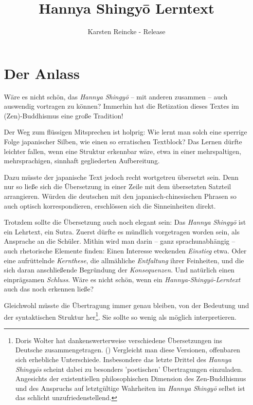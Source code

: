 \documentclass[
DIV=calc,
BCOR=5mm,
11pt,
headings=small,
oneside,
bibtotocnumbered,
english,ngerman]{scrartcl}
\begin{document}

\nocite{*}

\titlehead{Mit Dank an meine Frau für ihren wunderbaren Mut zu neuen guten
Wegen:}
\title{Hannya Shingyō Lerntext}
\author{Karsten Reincke 
 - Release  }

\maketitle
\section{Der Anlass}
 
Wäre es nicht schön, das \emph{Hannya Shingyō} -- mit anderen zusammen -- auch
auswendig vortragen zu können? Immerhin hat die Retization dieses Textes im
(Zen)-Buddhismus eine große Tradition!

Der Weg zum flüssigen Mitsprechen ist holprig: Wie lernt man solch eine sperrige
Folge japanischer Silben, wie einen so erratischen Textblock? Das Lernen dürfte
leichter fallen, wenn eine Struktur erkennbar wäre, etwa in einer
mehrspaltigen, mehrsprachigen, sinnhaft gegliederten Aufbereitung.

Dazu müsste der japanische Text jedoch recht wortgetreu übersetzt sein.
Denn nur so ließe sich die Übersetzung in einer Zeile mit dem übersetzten
Satzteil arrangieren. Würden die deutschen mit den japanisch-chinesischen
Phrasen so auch optisch korrespondieren, erschlössen sich die
Sinneinheiten direkt.

Trotzdem sollte die Übersetzung auch noch elegant sein: Das \emph{Hannya
Shingyō} ist ein Lehrtext, ein Sutra. Zuerst dürfte es mündlich vorgetragen
worden sein, als Ansprache an die Schüler. Mithin wird man darin -- ganz
sprachunabhängig -- auch rhetorische Elemente finden: Einen Interesse weckenden
\emph{Einstieg} etwa. Oder eine aufrüttelnde \emph{Kernthese}, die allmähliche
\emph{Entfaltung} ihrer Feinheiten, und die sich daran anschließende Begründung
der \emph{Konsequenzen}. Und natürlich einen einprägsamen \emph{Schluss}. Wäre es
nicht schön, wenn ein \emph{Hannya-Shingyō-Lerntext} auch das noch erkennen
ließe?

Gleichwohl müsste die Übertragung immer genau bleiben, von der Bedeutung und der
syntaktischen Struktur her\footnote{Doris Wolter hat dankenswerterweise
verschiedene Übersetzungen ins Deutsche zusammengetragen.
(\cite[vgl.][\nopage]{Wolter2010a}) Vergleicht man diese Versionen, offenbaren
sich erhebliche Unterschiede. Insbesondere das letzte Drittel des \emph{Hannya
Shingyōs} scheint dabei zu besonders 'poetischen' Übertragungen einzuladen.
Angesichts der existentiellen philosophischen Dimension des Zen-Buddhismus und
des Anspruchs auf letztgültige Wahrheiten im \emph{Hannya Shingyō} selbst ist
das schlicht unzufriedenstellend.}. Sie sollte so wenig als möglich
interpretieren.
\end{document}
